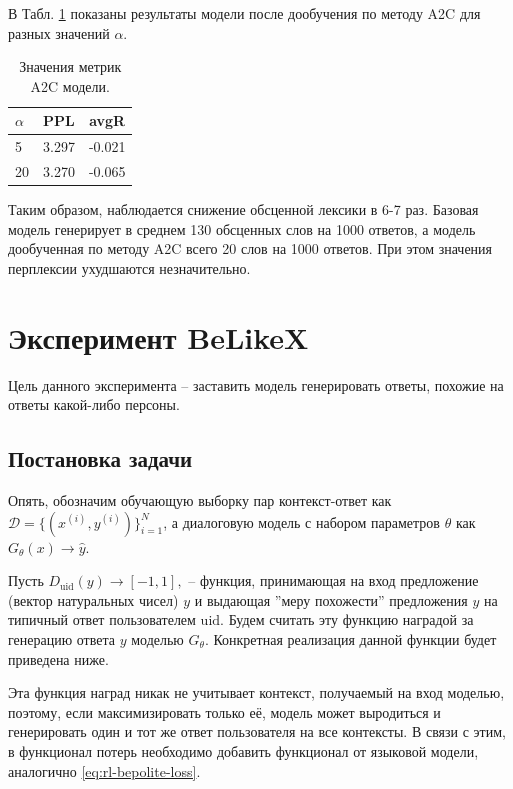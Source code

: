 \documentclass[12pt,a4paper]{amsart}
\begin{document}
В Табл. \ref{table:bepolite-results} показаны результаты модели после дообучения по методу A2C для разных значений $\alpha$.

\begingroup
\renewcommand{\arraystretch}{1.8}
\begin{table}[htbp!]
	\centering
	\begin{tabular}{|l|c|c|}
		\hline
		$\alpha$ & \textbf{PPL}                   &    \textbf{avgR} \\
		\hline 
		5 &  3.297 & -0.021 \\ 
		\hline
		20 & 3.270 & -0.065 \\
		\hline 
	\end{tabular}
	\caption{Значения метрик A2C модели.}
	\label{table:bepolite-results}
\end{table}
\endgroup

Таким образом, наблюдается снижение обсценной лексики в 6-7 раз. Базовая модель генерирует в среднем 130 обсценных слов на 1000 ответов, а модель дообученная по методу A2C всего 20 слов на 1000 ответов. При этом значения перплексии ухудшаются незначительно.


\pagebreak
\section{Эксперимент BeLikeX}

Цель данного эксперимента -- заставить модель генерировать ответы, похожие на ответы какой-либо персоны.

\subsection{Постановка задачи}

Опять, обозначим обучающую выборку пар контекст-ответ как $\mathcal{D} = \lbrace (x^{(i)}, y^{(i)}) \rbrace_{i=1}^N$, а диалоговую модель с набором параметров $\theta$ как $G_\theta (x) \rightarrow \hat{y}$. 

Пусть $D_{\text{uid}}(y) \rightarrow [-1, 1],$ -- функция, принимающая на вход предложение (вектор натуральных чисел) $y$ и выдающая ''меру похожести'' предложения $y$ на типичный ответ пользователем $\text{uid}$. Будем считать эту функцию наградой за генерацию ответа $y$ моделью $G_\theta$. Конкретная реализация данной функции будет приведена ниже.

Эта функция наград никак не учитывает контекст, получаемый на вход моделью, поэтому, если максимизировать только её, модель может выродиться и генерировать один и тот же ответ пользователя на все контексты. В связи с этим, в функционал потерь необходимо добавить функционал от языковой модели, аналогично \eqref{eq:rl-bepolite-loss}.
\end{document}
